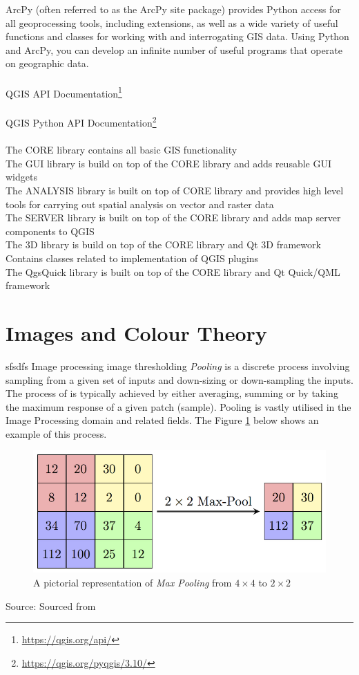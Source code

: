 ArcPy (often referred to as the ArcPy site package) provides Python access for all geoprocessing tools, including extensions, as well as a wide variety of useful functions and classes for working with and interrogating GIS data. Using Python and ArcPy, you can develop an infinite number of useful programs that operate on geographic data.
\\\\
QGIS API Documentation\footnote{\url{https://qgis.org/api/}}
\\\\
QGIS Python API Documentation\footnote{\url{https://qgis.org/pyqgis/3.10/}}
\\\\
The CORE library contains all basic GIS functionality\\
The GUI library is build on top of the CORE library and adds reusable GUI widgets\\
The ANALYSIS library is built on top of CORE library and provides high level tools for carrying out spatial analysis on vector and raster data\\
The SERVER library is built on top of the CORE library and adds map server components to QGIS\\
The 3D library is build on top of the CORE library and Qt 3D framework\\
Contains classes related to implementation of QGIS plugins\\
The QgsQuick library is built on top of the CORE library and Qt Quick/QML framework
\section{Images and Colour Theory}
\label{sec:col}
sfsdfs \cite{imgp} Image processing
image thresholding \cite{shap}
\textit{Pooling} is a discrete process involving sampling from a given set of inputs and down-sizing or down-sampling the inputs. The process of is typically achieved by either averaging, summing or by taking the maximum response of a given patch (sample)\cite{cnn,pool,murr}. Pooling is vastly utilised in the Image Processing domain and related fields. The Figure \ref{fig:pool} below shows an example of this process.
\begin{figure}[H]
\centering
\includegraphics[width=1\textwidth]{Figures/Chapter3/pool}
\caption{A pictorial representation of \textit{Max Pooling} from $4 \times 4$ to $2 \times 2$}
\label{fig:pool}
\end{figure}
\begin{center}
Source: Sourced from \cite{pool}
\end{center}